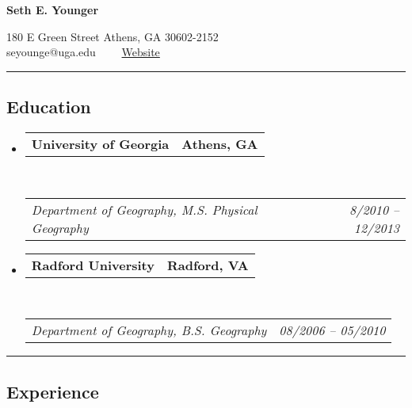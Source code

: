 \documentclass[10pt,letterpaper]{article}
\makeatletter
\newcommand{\headerrow}[2]
{\begin{tabular*}{\linewidth}{l@{\extracolsep{\fill}}r}
	#1 &
	#2 \\
\end{tabular*}}
\makeatother
\begin{document}
	

\begin{center}
{\LARGE \textbf{Seth E. Younger}}

180 E Green Street\textbullet
Athens, GA 30602-2152
\\
seyounge@uga.edu\ \ \textbullet
\ \ \href{http://www.sethyounger.com}{Website}
\end{center}

\hrule
\vspace{-0.4em}
\subsection*{Education}

\begin{itemize}
	\parskip=0.1em
	
	\item 
	\headerrow
	{\textbf{University of Georgia}}
	{\textbf{Athens, GA}}
	\\
	\headerrow
	{\emph{Department of Geography, M.S. Physical Geography}}
	{\emph{8/2010 -- 12/2013}}
	
	\item 
	\headerrow
	{\textbf{Radford University}}
	{\textbf{Radford, VA}}
	\\
	\headerrow
	{\emph{Department of Geography, B.S. Geography}}
	{\emph{08/2006 -- 05/2010}}
	
\end{itemize}

\hrule
\vspace{-0.4em}
\subsection*{Experience}
\end{document}
